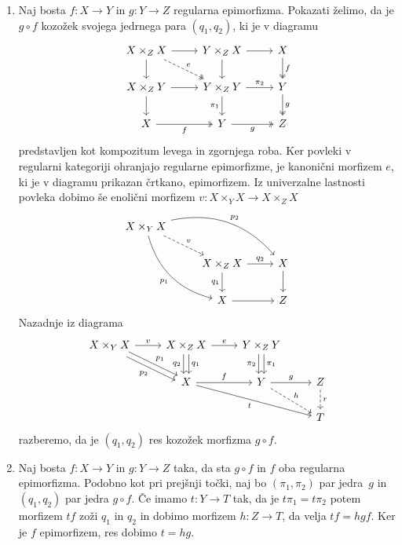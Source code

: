 \documentclass[../kategoricna_logika.tex]{subfiles}
\begin{document}
\begin{dokaz}
\begin{enumerate}[label=(\roman*)]
  \item %
    Naj bosta $f : X \to Y$ in $g : Y \to Z$ regularna epimorfizma.
    Pokazati želimo, da je $g \circ f$ kozožek svojega jedrnega para
    $(q_1, q_2)$, ki je v diagramu
    \begin{equation*}
      \begin{tikzcd}[column sep=normal]
        X \times_Z X \ar[d] \ar[r] \ar[dr, dashed, two heads, "e"]  & Y \times_Z X \ar[d ] \ar[r] & X \ar[d, two heads, "f"] \\
        X \times_Z Y \ar[d] \ar[r] & Y \times_Z Y \ar[d, "\pi_1"'] \ar[r, "\pi_2"] & Y \ar[d, two heads, "g"] \\
        X \ar[r, two heads, "f"'] & Y \ar[r, two heads, "g"'] & Z
      \end{tikzcd}
    \end{equation*}
    predstavljen kot kompozitum levega in zgornjega roba.  Ker povleki
    v regularni kategoriji ohranjajo regularne epimorfizme, je
    kanonični morfizem $e$, ki je v diagramu prikazan črtkano,
    epimorfizem.  Iz univerzalne lastnosti povleka dobimo še enolični
    morfizem $v : X \times_Y X \to X \times_Z X$
    \begin{equation*}
      \begin{tikzcd}[column sep=normal, row sep=normal]
        X \times_Y X \ar[ddr, bend right, "p_1"'] \ar[drr, bend left, "p_2"] \ar[dr, dashed, "v"] & & \\
        & X \times_Z X \ar[d, "q_1"'] \ar[r, "q_2"] & X \ar[d] \\
        & X \ar[r] & Z
      \end{tikzcd}
    \end{equation*}
    Nazadnje iz diagrama
    \begin{equation*}
      \begin{tikzcd}
        X \times_Y X \ar[dr, shift left, "p_1"] \ar[dr, shift right,
        "p_2"'] \ar[r, "v"] & X \times_Z X \ar[d, shift left, "q_1"]
        \ar[d, shift right, "q_2"'] \ar[r, "e"] &
        Y \times_Z Y \ar[d, shift left, "\pi_1"] \ar[d, shift right, "\pi_2"'] &  \\
        & X \ar[r, "f"] \ar[drr, "t"'] & Y \ar[r, "g"] \ar[dr, dashed, "h"] & Z \ar[d, dashed, "r"] \\
        & & & T
      \end{tikzcd}
    \end{equation*}
    razberemo, da je $(q_1, q_2)$ res kozožek morfizma $g \circ f$.

  \item %
    Naj bosta $f : X \to Y$ in $g : Y \to Z$ taka, da sta $g \circ f$
    in $f$ oba regularna epimorfizma.  Podobno kot pri prejšnji točki,
    naj bo $(\pi_1, \pi_2)$ par jedra~$g$ in $(q_1, q_2)$ par jedra
    $g \circ f$.  Če imamo $t : Y \to T$ tak, da je
    $t \pi_1 = t \pi_2$ potem morfizem $tf$ zoži $q_1$ in $q_2$ in
    dobimo morfizem $h : Z \to T$, da velja $t f = h g f$. Ker je $f$
    epimorfizem, res dobimo $t = h g$.
  \end{enumerate}
\end{dokaz}
\end{document}
